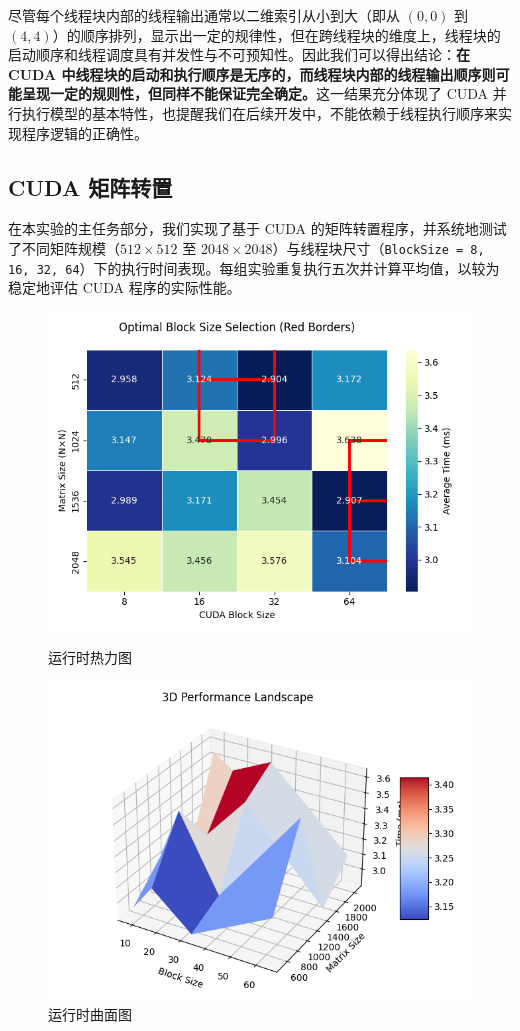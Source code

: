 \documentclass[a4paper, utf8]{ctexart}
\begin{document}
	尽管每个线程块内部的线程输出通常以二维索引从小到大（即从 $(0,0)$ 到 $(4,4)$）的顺序排列，显示出一定的规律性，但在跨线程块的维度上，线程块的启动顺序和线程调度具有并发性与不可预知性。因此我们可以得出结论：\textbf{在 CUDA 中线程块的启动和执行顺序是无序的，而线程块内部的线程输出顺序则可能呈现一定的规则性，但同样不能保证完全确定。}这一结果充分体现了 CUDA 并行执行模型的基本特性，也提醒我们在后续开发中，不能依赖于线程执行顺序来实现程序逻辑的正确性。
	
	\subsection{CUDA 矩阵转置}
	
	在本实验的主任务部分，我们实现了基于 CUDA 的矩阵转置程序，并系统地测试了不同矩阵规模（$512\times512$ 至 $2048\times2048$）与线程块尺寸（\verb|BlockSize = 8, 16, 32, 64|）下的执行时间表现。每组实验重复执行五次并计算平均值，以较为稳定地评估 CUDA 程序的实际性能。
	
	\begin{figure}
		\centering
		\begin{minipage}{.45\textwidth}
			\centering
			\includegraphics[width=.8\textwidth]{./figure/OptimalBlock.png}
			\caption{运行时热力图}
		\end{minipage}
		\begin{minipage}{.45\textwidth}
			\centering
			\includegraphics[width=.8\textwidth]{./figure/TimeLandscape.png}
			\caption{运行时曲面图}
		\end{minipage}
	\end{figure}
	
\end{document}
